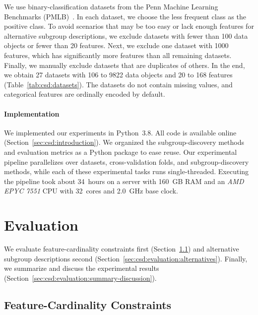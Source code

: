 \documentclass[acmsmall]{acmart} %
\theoremstyle{acmplain}
\theoremstyle{acmdefinition}
\begin{document}
We use binary-classification datasets from the Penn Machine Learning Benchmarks (PMLB)~\cite{olson2017pmlb, romano2021pmlb}.
In each dataset, we choose the less frequent class as the positive class.
To avoid scenarios that may be too easy or lack enough features for alternative subgroup descriptions, we exclude datasets with fewer than 100 data objects or fewer than 20 features.
Next, we exclude one dataset with 1000 features, which has significantly more features than all remaining datasets.
Finally, we manually exclude datasets that are duplicates of others.
In the end, we obtain 27 datasets with 106 to 9822 data objects and 20 to 168 features (Table~\ref{tab:csd:datasets}).
The datasets do not contain missing values, and categorical features are ordinally encoded by default.

\paragraph{Implementation}

We implemented our experiments in Python~3.8.
All code is available online (Section~\ref{sec:csd:introduction}).
We organized the subgroup-discovery methods and evaluation metrics as a Python package to ease reuse.
Our experimental pipeline parallelizes over datasets, cross-validation folds, and subgroup-discovery methods, while each of these experimental tasks runs single-threaded.
Executing the pipeline took about 34~hours on a server with 160~GB RAM and an \emph{AMD EPYC 7551} CPU with 32~cores and 2.0~GHz base clock.

\section{Evaluation}
\label{sec:csd:evaluation}

We evaluate feature-cardinality constraints first (Section~\ref{sec:csd:evaluation:cardinality}) and alternative subgroup descriptions second (Section~\ref{sec:csd:evaluation:alternatives}).
Finally, we summarize and discuss the experimental results (Section~\ref{sec:csd:evaluation:summary-discussion}).

\subsection{Feature-Cardinality Constraints}
\label{sec:csd:evaluation:cardinality}
\end{document}
